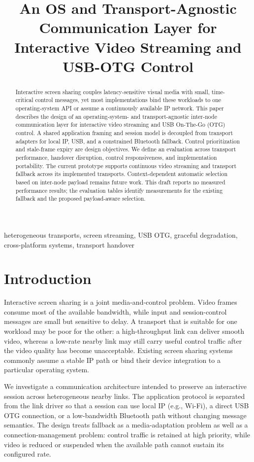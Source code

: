 \documentclass[conference]{IEEEtran}
\title{An OS and Transport-Agnostic Communication Layer for Interactive Video Streaming and USB-OTG Control}
\author{
\IEEEauthorblockN{Gavril Emil-Constantin}
\IEEEauthorblockA{Technical University of "Gheorghe Asachi"\\
Iasi, Romania\\
emil-constantin.gavril@student.tuiasi.ro}
}
\begin{document}
\maketitle

\begin{abstract}
Interactive screen sharing couples latency-sensitive visual media with small,
time-critical control messages, yet most implementations bind these workloads
to one operating-system API or assume a continuously available IP network.
This paper describes the design of an operating-system- and transport-agnostic
inter-node communication layer for interactive video streaming and USB
On-The-Go (OTG) control. A shared application framing and session model is
decoupled from transport adapters for local IP, USB, and a constrained
Bluetooth fallback. Control prioritization and stale-frame expiry are design
objectives. We define an evaluation across transport performance, handover
disruption, control responsiveness, and implementation portability. The current
prototype supports continuous video streaming and transport fallback across
its implemented transports. Context-dependent automatic selection based on
inter-node payload remains future work. This draft reports no measured
performance results; the evaluation tables identify measurements for the
existing fallback and the proposed payload-aware selection.
\end{abstract}

\begin{IEEEkeywords}
heterogeneous transports, screen streaming, USB OTG, graceful degradation,
cross-platform systems, transport handover
\end{IEEEkeywords}

\section{Introduction}
Interactive screen sharing is a joint media-and-control problem. Video frames
consume most of the available bandwidth, while input and session-control
messages are small but sensitive to delay. A transport that is suitable for
one workload may be poor for the other: a high-throughput link can deliver
smooth video, whereas a low-rate nearby link may still carry useful control
traffic after the video quality has become unacceptable. Existing screen
sharing systems commonly assume a stable IP path or bind their device
integration to a particular operating system.

We investigate a communication architecture intended to preserve an
interactive session across heterogeneous nearby links. The application
protocol is separated from the link driver so that a session can use local
IP (e.g., Wi-Fi), a direct USB OTG connection, or a low-bandwidth Bluetooth
path without changing message semantics. The design treats fallback as a
media-adaptation problem as well as a connection-management problem: control
traffic is retained at high priority, while video is reduced or suspended
when the available path cannot sustain its configured rate.
\end{document}
